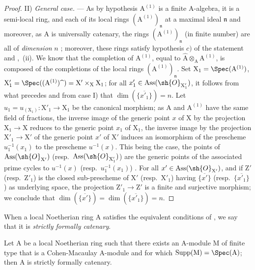 \begin{proof}
\medskip\noindent
II) \emph{General case.} ---
As by hypothesis $\mathrm{A}^{(1)}$ is a finite A-algebra, it is a semi-local ring, and each of its local rings $({\mathrm{A}^{(1)}})_\mathfrak{n}$ at a maximal ideal $\mathfrak{n}$ and moreover, as $\mathrm{A}$ is universally catenary, the rings $({\mathrm{A}^{(1)}})_\mathfrak{n}$ (in finite number) are all of \emph{dimension} $n$ ; moreover, these rings satisfy hypothesis $c)$ of the statement  and ,~(ii).
We know that the completion of $\mathrm{A}^{(1)}$, equal to $\widehat{\mathrm{A}}\otimes_\mathrm{A}\mathrm{A}^{(1)}$, is composed of the completions of the local rings $(\mathrm{A}^{(1)})_\mathfrak{n}$.
Set $\mathrm{X}_1=\Spec(\mathrm{A}^{(1)})$, $\mathrm{X}'_1=\Spec((\mathrm{A}^{(1)})\widehat{\phantom{x}})=\mathrm{X}'\times_\mathrm{X}\mathrm{X}_1$; for all $x'_1\in\operatorname{Ass}(\sh{O}_{\mathrm{X}'_1})$, it follows from what precedes and from case I) that $\dim(\overline{\{x'_1\}})=n$.
Let $u_1=u_{(\mathrm{X}_1)}:\mathrm{X}'_1\to\mathrm{X}_1$ be the canonical morphism; as $\mathrm{A}$ and $\mathrm{A}^{(1)}$ have the same field of fractions, the inverse image of the generic point $x$ of $\mathrm{X}$ by the projection $\mathrm{X}_1\to\mathrm{X}$ reduces to the generic point $x_1$ of $\mathrm{X}_1$, the inverse image by the projection $\mathrm{X}'_1\to\mathrm{X}'$ of the generic point $x'$ of $\mathrm{X}'$ induces an isomorphism of the prescheme $u_1^{-1}(x_1)$ to the prescheme $u^{-1}(x)$.
This being the case, the points of $\operatorname{Ass}(\sh{O}_{\mathrm{X}'})$ (resp.~$\operatorname{Ass}(\sh{O}_{\mathrm{X}'_1})$) are the generic points of the associated prime cycles to $u^{-1}(x)$ (resp.~$u_1^{-1}(x_1)$) .
For all $x'\in\operatorname{Ass}(\sh{O}_{\mathrm{X}'})$, and if $\mathrm{Z}'$ (resp.~$\mathrm{Z}'_1$) is the closed sub-prescheme of $\mathrm{X}'$ (resp.~$\mathrm{X}'_1$) having $\overline{\{x'\}}$ (resp.~$\overline{\{x'_1\}}$) as underlying space, the projection $\mathrm{Z}'_1\to\mathrm{Z}'$ is a finite and surjective morphism; we conclude  that $\dim(\overline{\{x'\}})=\dim(\overline{\{x'_1\}})=n$.
\end{proof}

\begin{definition}[7.2.6]
\label{IV.7.2.6}
When a local Noetherian ring $\mathrm{A}$ satisfies the equivalent conditions of , we say that it is \emph{strictly formally catenary}.
\end{definition}

\begin{corollary}[7.2.7]
\label{IV.7.2.7}
Let $\mathrm{A}$ be a local Noetherian ring such that there exists an $\mathrm{A}$-module $\mathrm{M}$ of finite type that is a Cohen-Macaulay $\mathrm{A}$-module and for which $\operatorname{Supp}(\mathrm{M})=\Spec(\mathrm{A})$; then $\mathrm{A}$ is strictly formally catenary.
\end{corollary}

